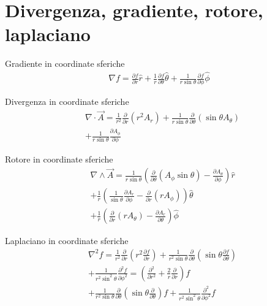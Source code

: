 \section{Divergenza, gradiente, rotore, laplaciano}

\begin{usefull}{Gradiente in coordinate sferiche}
\begin{align*}
\nabla f=\frac{\partial f}{\partial r}\hat{r}+\frac{1}{r}\frac{\partial f}{\partial \theta}\hat{\theta}+\frac{1}{r\sin{\theta}}\frac{\partial f}{\partial \phi}\hat{\phi}    
\end{align*}
\end{usefull}

\begin{usefull}{Divergenza in coordinate sferiche}
\begin{align*}
&\nabla\cdot\vec{A}=\frac{1}{r^2}\frac{\partial}{\partial r}(r^2A_r)+\frac{1}{r\sin{\theta}}\frac{\partial }{\partial \theta}(\sin{\theta}A_{\theta})\\
&+\frac{1}{r\sin{\theta}}\frac{\partial A_{\phi}}{\partial \phi}
\end{align*}
\end{usefull}

\begin{usefull}{Rotore in coordinate sferiche}
\begin{align*}
&\nabla\wedge\vec{A}=\frac{1}{r\sin{\theta}}(\frac{\partial}{\partial \theta}(A_{\phi}\sin{\theta})-\frac{\partial A_{\theta}}{\partial \phi})\hat{r}\\
&+\frac{1}{r}(\frac{1}{\sin{\theta}}\frac{\partial A_r}{\partial \phi}-\frac{\partial}{\partial r}(rA_{\phi}))\hat{\theta}\\
&+\frac{1}{r}(\frac{\partial}{\partial r}(rA_{\theta})-\frac{\partial A_r}{\partial \theta})\hat{\phi}
\end{align*}
\end{usefull}

\begin{usefull}{Laplaciano in coordinate sferiche}
\begin{align*}
&\nabla^2f=\frac{1}{r^2}\frac{\partial}{\partial r}(r^2\frac{\partial f}{\partial r})+\frac{1}{r^2\sin{\theta}}\frac{\partial}{\partial \theta}(\sin{\theta}\frac{\partial f}{\partial \theta})\\
&+\frac{1}{r^2\sin^2{\theta}}\frac{\partial^2f}{\partial \phi^2}=(\frac{\partial^2}{\partial r^2}+\frac{2}{r}\frac{\partial}{\partial r})f\\
&+\frac{1}{r^2\sin{\theta}}\frac{\partial}{\partial\theta}(\sin{\theta}\frac{\partial}{\partial \theta})f+\frac{1}{r^2\sin^2{\theta}}\frac{\partial^2}{\partial \phi^2}f
\end{align*}

\end{usefull}

